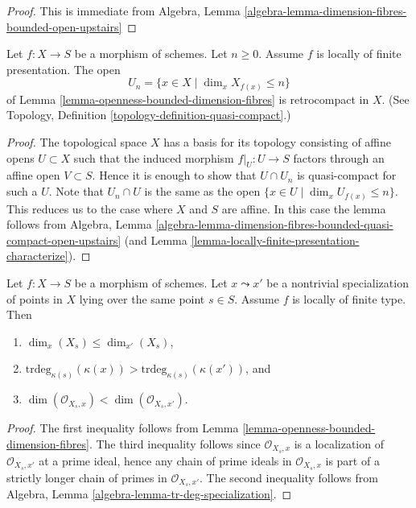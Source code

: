 \begin{proof}
This is immediate from
Algebra,
Lemma \ref{algebra-lemma-dimension-fibres-bounded-open-upstairs}
\end{proof}

\begin{lemma}
\label{lemma-openness-bounded-dimension-fibres-finite-presentation}
Let $f : X \to S$ be a morphism of schemes.
Let $n \geq 0$. Assume $f$ is locally of finite presentation.
The open
$$
U_n = \{x \in X \mid \dim_x X_{f(x)} \leq n\}
$$
of Lemma \ref{lemma-openness-bounded-dimension-fibres} is retrocompact
in $X$. (See Topology, Definition \ref{topology-definition-quasi-compact}.)
\end{lemma}

\begin{proof}
The topological space $X$ has a basis for its topology consisting of
affine opens $U \subset X$ such that the induced morphism
$f|_U : U \to S$ factors through an affine open $V \subset S$. Hence
it is enough to show that $U \cap U_n$ is quasi-compact for such a $U$.
Note that $U_n \cap U$ is the same as the open
$\{x \in U \mid \dim_x U_{f(x)} \leq n\}$. This reduces us to the case
where $X$ and $S$ are affine. In this case the lemma follows from
Algebra,
Lemma \ref{algebra-lemma-dimension-fibres-bounded-quasi-compact-open-upstairs}
(and Lemma \ref{lemma-locally-finite-presentation-characterize}).
\end{proof}

\begin{lemma}
\label{lemma-dimension-fibre-specialization}
Let $f : X \to S$ be a morphism of schemes.
Let $x \leadsto x'$ be a nontrivial specialization of points in $X$
lying over the same point $s \in S$. Assume $f$ is locally of finite type.
Then
\begin{enumerate}
\item $\dim_x(X_s) \leq \dim_{x'}(X_s)$,
\item $\text{trdeg}_{\kappa(s)}(\kappa(x)) >
\text{trdeg}_{\kappa(s)}(\kappa(x'))$, and
\item $\dim(\mathcal{O}_{X_s, x}) < \dim(\mathcal{O}_{X_s, x'})$.
\end{enumerate}
\end{lemma}

\begin{proof}
The first inequality follows from
Lemma \ref{lemma-openness-bounded-dimension-fibres}.
The third inequality follows since $\mathcal{O}_{X_s, x}$ is a localization
of $\mathcal{O}_{X_s, x'}$ at a prime ideal, hence any chain of prime ideals in
$\mathcal{O}_{X_s, x}$ is part of a strictly longer chain of
primes in $\mathcal{O}_{X_s, x'}$.
The second inequality follows from
Algebra, Lemma \ref{algebra-lemma-tr-deg-specialization}.
\end{proof}






